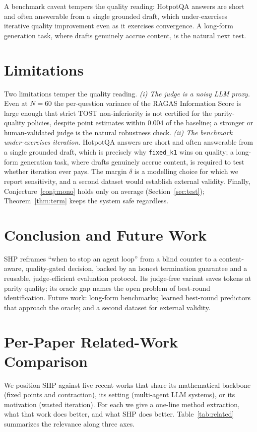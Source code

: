 \documentclass[conference]{IEEEtran}
\begin{document}
A benchmark caveat tempers the quality reading: HotpotQA answers are short and
often answerable from a single grounded draft, which under-exercises iterative
quality improvement even as it exercises convergence. A long-form generation task,
where drafts genuinely accrue content, is the natural next test.

\section{Limitations}\label{sec:limits}
Two limitations temper the quality reading. \emph{(i) The judge is a noisy LLM
proxy.} Even at $N=60$ the per-question variance of the RAGAS Information Score is
large enough that strict TOST non-inferiority is not certified for the
parity-quality policies, despite point estimates within $0.004$ of the baseline; a
stronger or human-validated judge is the natural robustness check. \emph{(ii) The
benchmark under-exercises iteration.} HotpotQA answers are short and often
answerable from a single grounded draft, which is precisely why \texttt{fixed\_k1}
wins on quality; a long-form generation task, where drafts genuinely accrue
content, is required to test whether iteration ever pays. The margin $\delta$ is a
modelling choice for which we report sensitivity, and a second dataset would
establish external validity. Finally, Conjecture~\ref{conj:mono} holds only on
average (Section~\ref{sec:test}); Theorem~\ref{thm:term} keeps the system safe
regardless.

\section{Conclusion and Future Work}\label{sec:conclusion}
SHP reframes ``when to stop an agent loop'' from a blind counter to a content-aware,
quality-gated decision, backed by an honest termination guarantee and a reusable,
judge-efficient evaluation protocol. Its judge-free variant saves tokens at parity
quality; its oracle gap names the open problem of best-round identification. Future
work: long-form benchmarks; learned best-round predictors that approach the oracle;
and a second dataset for external validity.

\appendices
\section{Per-Paper Related-Work Comparison}\label{app:related}
We position SHP against five recent works that share its mathematical backbone
(fixed points and contraction), its setting (multi-agent LLM systems), or its
motivation (wasted iteration). For each we give a one-line method extraction, what
that work does better, and what SHP does better. Table~\ref{tab:related} summarizes
the relevance along three axes.
\end{document}
